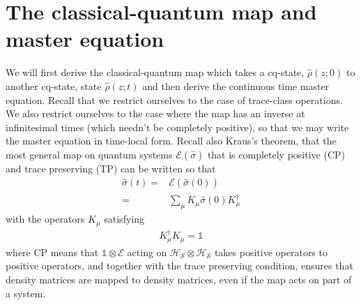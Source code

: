 \documentclass[aps,pra,showpacs,citeautoscript,amsmath,amssymb,floatfix,superscriptaddress,bbm, verbatim,amsfonts,changes,12pt,nofootinbib,longbibliography]{revtex4-2}
\newcommand{\id}{\mathbb{1}}
\def\z{{z}}
\renewcommand{\varrho}{\hat{\rho}}
\def\cqstate{\varrho}
\def\psizt{{\varrho(\z;t)}}
\def\t0{0}
\begin{document}
\section{The classical-quantum map and master equation}
\label{sec:cq-dynamics}

We will first derive the classical-quantum map which takes a cq-state, $\cqstate(\z;\t0)$ to another cq-state, state $\psizt$ and then derive the continuous time master equation. Recall that we restrict ourselves to the case of trace-class operations. We also restrict ourselves to the case where the map has an inverse at infinitesimal times (which needn't be completely positive), so that we may write the master equation in time-local form\cite{time-local}. %
Recall also Kraus's theorem, that the most general map on quantum systems $\mathcal{E}(\hat{\sigma})$ that is completely positive (CP) and trace preserving (TP) can be written so that
\begin{align}
\hat{\sigma}(t)=&\mathcal{E}(\hat{\sigma}(0))\nonumber\\
=&\sum_\mu K_\mu \hat{\sigma}(0) K^\dagger_\mu
\label{eq:kraus}
\end{align}
with the operators $K_\mu$ satisfying
\begin{align}
K_\mu^\dagger K_\mu=\id
\end{align}
where CP means that 
$\id\otimes\mathcal{E}$ acting on $\mathcal{H_S}\otimes\mathcal{H_S}$ takes positive operators to positive operators, and together with the trace preserving condition, ensures that density matrices are mapped to density matrices, even if the map acts on part of a system. 
\end{document}
